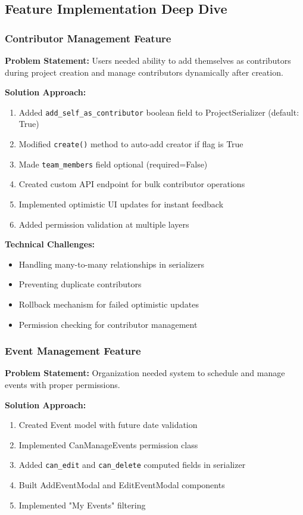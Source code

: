 \documentclass[11pt,a4paper]{article}
\begin{document}
\subsection{Feature Implementation Deep Dive}

\subsubsection{Contributor Management Feature}
\textbf{Problem Statement:} Users needed ability to add themselves as contributors during project creation and manage contributors dynamically after creation.

\textbf{Solution Approach:}
\begin{enumerate}[leftmargin=*]
    \item Added \texttt{add\_self\_as\_contributor} boolean field to ProjectSerializer (default: True)
    \item Modified \texttt{create()} method to auto-add creator if flag is True
    \item Made \texttt{team\_members} field optional (required=False)
    \item Created custom API endpoint for bulk contributor operations
    \item Implemented optimistic UI updates for instant feedback
    \item Added permission validation at multiple layers
\end{enumerate}

\textbf{Technical Challenges:}
\begin{itemize}[leftmargin=*]
    \item Handling many-to-many relationships in serializers
    \item Preventing duplicate contributors
    \item Rollback mechanism for failed optimistic updates
    \item Permission checking for contributor management
\end{itemize}

\subsubsection{Event Management Feature}
\textbf{Problem Statement:} Organization needed system to schedule and manage events with proper permissions.

\textbf{Solution Approach:}
\begin{enumerate}[leftmargin=*]
    \item Created Event model with future date validation
    \item Implemented CanManageEvents permission class
    \item Added \texttt{can\_edit} and \texttt{can\_delete} computed fields in serializer
    \item Built AddEventModal and EditEventModal components
    \item Implemented "My Events" filtering
\end{enumerate}
\end{document}
